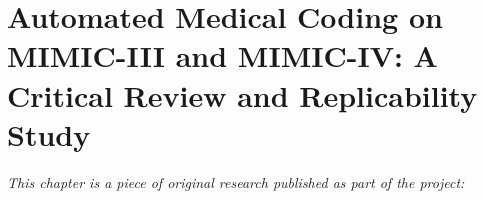 
\chapter[automated medical coding on mimic-iii and mimic-iv: a critical review and replicability study]{Automated Medical Coding on MIMIC-III and MIMIC-IV: A Critical Review and Replicability Study}
\label{chp:paper-automated}

\textit{This chapter is a piece of original research published as part of the project:} \newline
\begin{center}
    \begin{enumerate}[leftmargin=8mm,rightmargin=8mm,topsep=0mm,label={[\Alph*]}]
        \setcounter{enumi}{4}
        \item {} \co \hspace{0.1em} \parencite{edin_automated_2023}
    \end{enumerate}
\end{center}

